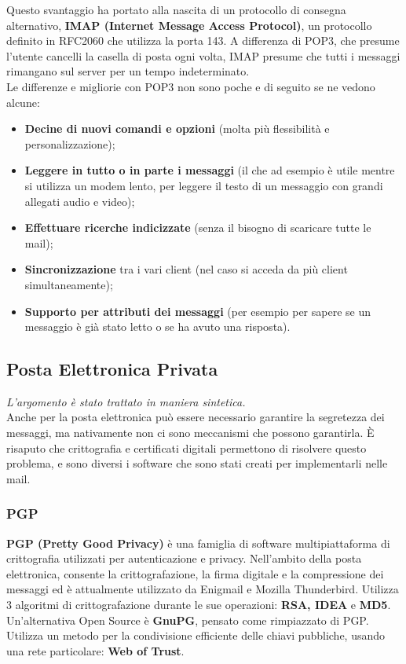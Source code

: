         Questo svantaggio ha portato alla nascita di un protocollo di consegna alternativo, \textbf{IMAP
        (Internet Message Access Protocol)}, un protocollo definito in RFC2060 che utilizza la porta
        143. A differenza di POP3, che presume l’utente cancelli la casella di posta ogni volta, IMAP
        presume che tutti i messaggi rimangano sul server per un tempo indeterminato.\\

        Le differenze e migliorie con POP3 non sono poche e di seguito se ne vedono alcune:

        \begin{itemize}
            \item \textbf{Decine di nuovi comandi e opzioni} (molta più flessibilità e personalizzazione);
            \item \textbf{Leggere in tutto o in parte i messaggi} (il che ad esempio è utile mentre si utilizza un
            modem lento, per leggere il testo di un messaggio con grandi allegati audio e video);
            \item \textbf{Effettuare ricerche indicizzate} (senza il bisogno di scaricare tutte le mail);
            \item \textbf{Sincronizzazione} tra i vari client (nel caso si acceda da più client simultaneamente);
            \item \textbf{Supporto per attributi dei messaggi} (per esempio per sapere se un messaggio è già
            stato letto o se ha avuto una risposta).
        \end{itemize}
        
    \subsection{Posta Elettronica Privata}
        \textit{L’argomento è stato trattato in maniera sintetica.}\\
            
        Anche per la posta elettronica può essere necessario garantire la segretezza dei messaggi, ma
        nativamente non ci sono meccanismi che possono garantirla. È risaputo che crittografia e
        certificati digitali permettono di risolvere questo problema, e sono diversi i software che sono
        stati creati per implementarli nelle mail.

        \subsubsection{PGP}
            \textbf{PGP (Pretty Good Privacy)} è una famiglia di software multipiattaforma di crittografia
            utilizzati per autenticazione e privacy. Nell’ambito della posta elettronica, consente la
            crittografazione, la firma digitale e la compressione dei messaggi ed è attualmente utilizzato da
            Enigmail e Mozilla Thunderbird. Utilizza 3 algoritmi di crittografazione durante le sue
            operazioni: \textbf{RSA, IDEA} e \textbf{MD5}.\\

            Un’alternativa Open Source è \textbf{GnuPG}, pensato come rimpiazzato di PGP. Utilizza un metodo per
            la condivisione efficiente delle chiavi pubbliche, usando una rete particolare: \textbf{Web of Trust}.
